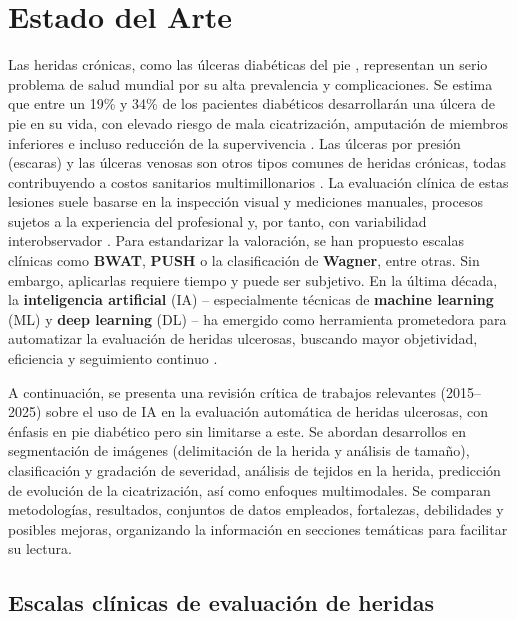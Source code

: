 \section{Estado del Arte}
\label{sc:EA}


Las heridas crónicas, como las úlceras diabéticas del pie , representan un serio problema de salud mundial por su alta prevalencia y complicaciones. Se estima que entre un 19\% y 34\% de los pacientes diabéticos desarrollarán una úlcera de pie en su vida, con elevado riesgo de mala cicatrización, amputación de miembros inferiores e incluso reducción de la supervivencia \cite{Zhang2022}. Las úlceras por presión (escaras) y las úlceras venosas son otros tipos comunes de heridas crónicas, todas contribuyendo a costos sanitarios multimillonarios \cite{Wang2020,Sendilraj2024}. La evaluación clínica de estas lesiones suele basarse en la inspección visual y mediciones manuales, procesos sujetos a la experiencia del profesional y, por tanto, con variabilidad interobservador \cite{Curti2024}. Para estandarizar la valoración, se han propuesto escalas clínicas como \textbf{BWAT}, \textbf{PUSH} o la clasificación de \textbf{Wagner}, entre otras. Sin embargo, aplicarlas requiere tiempo y puede ser subjetivo. En la última década, la \textbf{inteligencia artificial} (IA) – especialmente técnicas de \textbf{machine learning} (ML) y \textbf{deep learning} (DL) – ha emergido como herramienta prometedora para automatizar la evaluación de heridas ulcerosas, buscando mayor objetividad, eficiencia y seguimiento continuo \cite{Sendilraj2024,Curti2024}.

A continuación, se presenta una revisión crítica de trabajos relevantes (2015–2025) sobre el uso de IA en la evaluación automática de heridas ulcerosas, con énfasis en pie diabético pero sin limitarse a este. Se abordan desarrollos en segmentación de imágenes (delimitación de la herida y análisis de tamaño), clasificación y gradación de severidad, análisis de tejidos en la herida, predicción de evolución de la cicatrización, así como enfoques multimodales. Se comparan metodologías, resultados, conjuntos de datos empleados, fortalezas, debilidades y posibles mejoras, organizando la información en secciones temáticas para facilitar su lectura.

\subsection{Escalas clínicas de evaluación de heridas}

